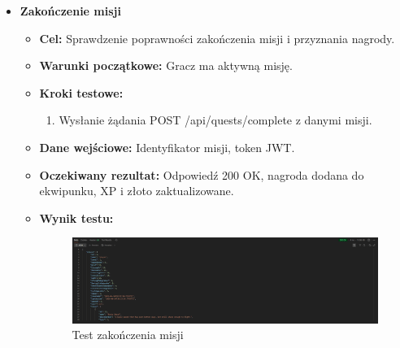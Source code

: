 \begin{itemize}
    \item \textbf{Zakończenie misji}
    \begin{itemize}
        \item \textbf{Cel:} Sprawdzenie poprawności zakończenia misji i przyznania nagrody.
        \item \textbf{Warunki początkowe:} Gracz ma aktywną misję.
        \item \textbf{Kroki testowe:}
        \begin{enumerate}
            \item Wysłanie żądania POST /api/quests/complete z danymi misji.
        \end{enumerate}
        \item \textbf{Dane wejściowe:} Identyfikator misji, token JWT.
        \item \textbf{Oczekiwany rezultat:} Odpowiedź 200 OK, nagroda dodana do ekwipunku, XP i złoto zaktualizowane.
        \item \textbf{Wynik testu:}
        \begin{figure}[H]
            \includegraphics[width=480px]{figures/testy/test-completequest.png}
            \caption{Test zakończenia misji}
        \end{figure}
    \end{itemize}


\end{itemize}
